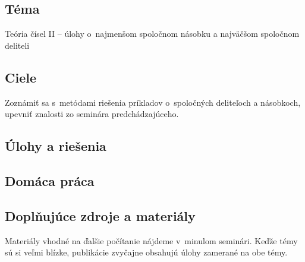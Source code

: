 

\subsection*{Téma}
Teória čísel II -- úlohy o~najmenšom spoločnom násobku a najväčšom spoločnom deliteli

\subsection*{Ciele}
Zoznámiť sa s~metódami riešenia príkladov o~spoločných deliteľoch a násobkoch, upevniť znalosti zo seminára predchádzajúceho.

\subsection*{Úlohy a riešenia}























\subsection*{Domáca práca}






\subsection*{Doplňujúce zdroje a materiály}
Materiály vhodné na ďalšie počítanie nájdeme v~minulom seminári. Keďže témy sú si veľmi blízke, publikácie zvyčajne obsahujú úlohy zamerané na obe témy.


